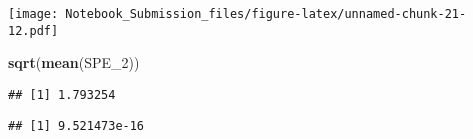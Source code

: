 \documentclass[
]{article}
\newenvironment{Shaded}{\begin{snugshade}}{\end{snugshade}}
\newcommand{\DecValTok}[1]{\textcolor[rgb]{0.00,0.00,0.81}{#1}}
\newcommand{\KeywordTok}[1]{\textcolor[rgb]{0.13,0.29,0.53}{\textbf{#1}}}
\newcommand{\NormalTok}[1]{#1}
\newcommand{\OperatorTok}[1]{\textcolor[rgb]{0.81,0.36,0.00}{\textbf{#1}}}
\newcommand{\StringTok}[1]{\textcolor[rgb]{0.31,0.60,0.02}{#1}}
\begin{document}
\texttt{[image: Notebook\_Submission\_files/figure-latex/unnamed-chunk-21-12.pdf]}

\begin{Shaded}
\begin{Highlighting}[]
\KeywordTok{sqrt}\NormalTok{(}\KeywordTok{mean}\NormalTok{(SPE_}\DecValTok{2}\NormalTok{))}
\end{Highlighting}
\end{Shaded}

\begin{verbatim}
## [1] 1.793254
\end{verbatim}

\begin{Shaded}
\end{Shaded}

\begin{verbatim}
## [1] 9.521473e-16
\end{verbatim}
\end{document}
